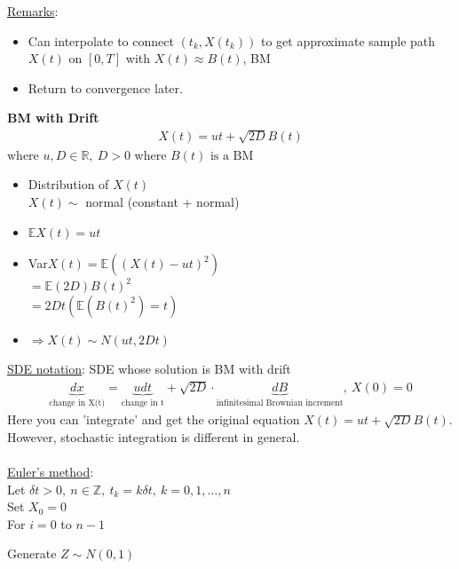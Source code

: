 \documentclass[12pt, letterpaper]{article}
\begin{document}
\underline{Remarks}:
\begin{itemize}
    \item Can interpolate to connect $(t_k, X(t_k))$ to get approximate sample path $X(t)$
    on $[0,T]$ with $X(t) \approx B(t)$, BM
    \item Return to convergence later.
\end{itemize}
\textbf{BM with Drift} \\
\begin{align*}
    X(t) = ut + \sqrt{2D} B(t)
\end{align*}
$\text{where } u,D \in \mathbb{R},\ D > 0$ where $B(t) \text{ is a BM}$
\begin{itemize}
    \item Distribution of $X(t)$ \\
    $X(t) \sim $ normal (constant + normal)
    \item $\mathbb{E}X(t) = ut$
    \item Var$X(t) = \mathbb{E}((X(t)-ut)^2)$ \\
    $= \mathbb{E}(2D)B(t)^2$ \\
    $= 2Dt(\mathbb{E}(B(t)^2) = t)$
    \item $\Rightarrow X(t) \sim N(ut, 2Dt)$
\end{itemize}
\underline{SDE notation}:
SDE whose solution is BM with drift \\
\begin{align*}
    \underbrace{dx}_{\text{change in X(t)}} = \underbrace{udt}_{\text{change in t}} + \sqrt{2D} \cdot \underbrace{dB}_{\text{infinitesimal Brownian increment}},\ X(0) = 0
\end{align*}
Here you can 'integrate' and get the original equation $X(t) = ut + \sqrt{2D} B(t)$. However,
stochastic integration is different in general. \\ \\
\underline{Euler's method}: \\
Let $\delta t > 0,\ n \in \mathbb{Z},\ t_k = k\delta t,\ k = 0,1,\dots, n$ \\
Set $X_0 = 0$\\
For $i = 0$ to $n-1$ 

Generate $Z\sim N(0,1)$
\end{document}
